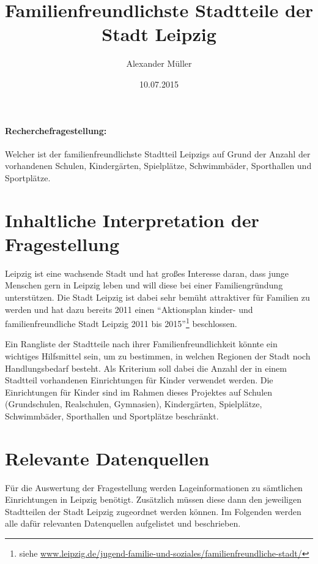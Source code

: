 \documentclass[parskip]{scrartcl}
\begin{document}
\subject{Projektdokumentation im Modul Semantic Web}
\title{Familienfreundlichste Stadtteile der Stadt Leipzig}
\author{Alexander Müller}
\date{10.07.2015}

\maketitle


\paragraph{Recherchefragestellung: }
Welcher ist der familienfreundlichste Stadtteil Leipzigs auf Grund der Anzahl der vorhandenen Schulen, Kindergärten, Spielplätze, Schwimmbäder, Sporthallen und Sportplätze.


\section{Inhaltliche Interpretation der Fragestellung}
Leipzig ist eine wachsende Stadt und hat großes Interesse daran, dass junge Menschen gern in Leipzig leben und will diese bei einer Familiengründung unterstützen. Die Stadt Leipzig ist dabei sehr bemüht attraktiver für Familien zu werden und hat dazu bereits 2011 einen "`Aktionsplan kinder- und familienfreundliche Stadt Leipzig 2011 bis 2015"'\footnote{siehe \url{www.leipzig.de/jugend-familie-und-soziales/familienfreundliche-stadt/}} beschlossen.

Ein Rangliste der Stadtteile nach ihrer Familienfreundlichkeit könnte ein wichtiges Hilfsmittel sein, um zu bestimmen, in welchen Regionen der Stadt noch Handlungsbedarf besteht. Als Kriterium soll dabei die Anzahl der in einem Stadtteil vorhandenen Einrichtungen für Kinder verwendet werden. Die Einrichtungen für Kinder sind im Rahmen dieses Projektes auf Schulen (Grundschulen, Realschulen, Gymnasien), Kindergärten, Spielplätze, Schwimmbäder, Sporthallen und Sportplätze beschränkt.


\section{Relevante Datenquellen}
Für die Auswertung der Fragestellung werden Lageinformationen zu sämtlichen Einrichtungen in Leipzig benötigt. Zusätzlich müssen diese dann den jeweiligen Stadtteilen der Stadt Leipzig zugeordnet werden können. Im Folgenden werden alle dafür relevanten Datenquellen aufgelistet und beschrieben.
\end{document}
